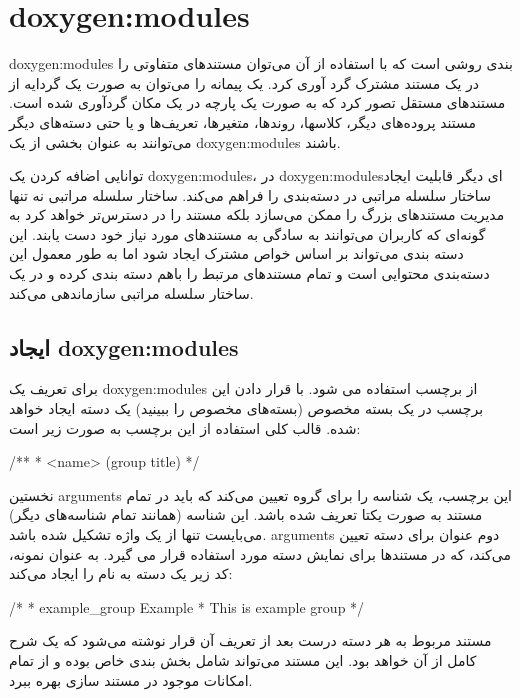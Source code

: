 
\section{\glspl{doxygen:module}‌}

\glspl{doxygen:module} بندی روشی است که با استفاده از آن می‌توان مستندهای متفاوتی را در یک
مستند مشترک گرد آوری کرد. یک پیمانه را می‌توان به صورت یک گردایه از مستندهای مستقل
تصور کرد که به صورت یک پارچه در یک مکان گردآوری شده است. مستند
پروده‌های دیگر، کلاسها، روندها، متغیرها، تعریف‌ها و یا حتی دسته‌های دیگر  می‌توانند به عنوان
بخشی از یک \glspl{doxygen:module} باشند.
 
توانایی اضافه کردن یک \glspl{doxygen:module}، در \glspl{doxygen:module}‌ای دیگر قابلیت ایجاد ساختار سلسله مراتبی در
دسته‌بندی را فراهم می‌کند. ساختار سلسله مراتبی نه تنها مدیریت مستندهای بزرگ
را ممکن می‌سازد بلکه مستند را در دسترس‌تر خواهد کرد به گونه‌ای که کاربران
می‌توانند به سادگی به مستندهای مورد نیاز خود دست یابند. این دسته بندی می‌تواند بر اساس خواص
مشترک ایجاد شود اما به طور معمول این دسته‌بندی محتوایی است و تمام مستندهای مرتبط را باهم 
دسته بندی کرده و در یک ساختار سلسله مراتبی سازماندهی می‌کند.

\subsection{ایجاد \glspl{doxygen:module}}

برای تعریف یک \glspl{doxygen:module} از برچسب  استفاده می شود. با قرار دادن این برچسب
در یک بسته مخصوص (بسته‌های مخصوص را ببینید) یک دسته ایجاد خواهد شده. قالب کلی
استفاده از این برچسب به صورت زیر است:
\begin{C++}
/**
 *  <name> (group title)
 */
\end{C++}

نخستین \glspl{argument} این برچسب، یک شناسه را برای گروه تعیین می‌کند که باید در تمام
مستند به صورت یکتا تعریف شده باشد. این شناسه (همانند تمام شناسه‌های دیگر) می‌بایست
تنها از یک واژه تشکیل شده باشد. \glspl{argument} دوم عنوان برای دسته
تعیین می‌کند، که در مستندها برای نمایش دسته مورد استفاده قرار می گیرد. 
به عنوان نمونه، کد زیر یک دسته به نام   را ایجاد می‌کند:

\begin{C++}
/*
 *  example_group Example
 * This is example group
 */
\end{C++}

مستند مربوط به هر دسته درست بعد از تعریف آن قرار نوشته می‌شود که یک شرح کامل از
آن خواهد بود. این مستند می‌تواند
شامل بخش بندی خاص بوده و از تمام امکانات موجود در مستند سازی بهره ببرد.

